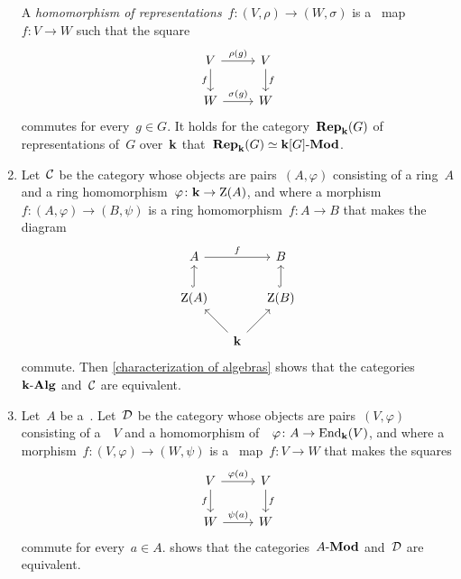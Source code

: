 \begin{example}
\begin{enumerate}
      A \emph{homomorphism of representations}~$f \colon (V, \rho) \to (W,\sigma)$ is a~{\klin} map~$f \colon V \to W$ such that the square
      \[
        \begin{tikzcd}
            V
            \arrow{r}[above]{\rho(g)}
            \arrow{d}[left]{f}
          & V
            \arrow{d}[right]{f}
          \\
            W
            \arrow{r}[above]{\sigma(g)}
          & W
        \end{tikzcd}
      \]
      commutes for every~$g \in G$.
      It holds for the category~$\mathbf{Rep}_{\mathbf{k}}(G)$ of representations of~$G$ over~$\kf$ that~$\mathbf{Rep}_{\mathbf{k}}(G) \simeq \text{$\mathbf{k}[G]$-$\mathbf{Mod}$}$.
    \item
      Let~$\mathcal{C}$ be the category whose objects are pairs~$(A, \varphi)$ consisting of a ring~$A$ and a ring homomorphism~$\varphi \colon \mathbf{k} \to \operatorname{Z}(A)$, and where a morphism~$f \colon (A, \varphi) \to (B, \psi)$ is a ring homomorphism~$f \colon A \to B$ that makes the diagram
      \[
        \begin{tikzcd}[column sep = small]
            A
            \arrow{rr}[above]{f}
          & {}
          & B
          \\
            \ringcenter(A)
            \arrow[hook]{u}
          & {}
          & \ringcenter(B)
            \arrow[hook]{u}
          \\
            {}
          & \kf
            \arrow{ul}
            \arrow{ur}
          & {}
        \end{tikzcd}
      \]
      commute.
      Then \cref{characterization of algebras} shows that the categories~$\text{$\mathbf{k}$-$\mathbf{Alg}$}$ and~$\mathcal{C}$ are equivalent.
    \item
      Let~$A$ be a~{\kalg}.
      Let~$\mathcal{D}$ be the category whose objects are pairs~$(V, \varphi)$ consisting of a~{\module{$\kf$}}~$V$ and a homomorphism of~{\kalgs}~$\varphi \colon A \to \operatorname{End}_{\mathbf{k}}(V)$, and where a morphism~$f \colon (V,\varphi) \to (W,\psi)$ is a~{\klin} map~$f \colon V \to W$ that makes the squares
      \[
        \begin{tikzcd}
            V
            \arrow{r}[above]{\varphi(a)}
            \arrow{d}[left]{f}
          & V
            \arrow{d}[right]{f}
          \\
            W
            \arrow{r}[above]{\psi(a)}
          & W
        \end{tikzcd}
      \]
      commute for every~$a \in A$.
       shows that the categories~$\text{$A$-$\mathbf{Mod}$}$ and~$\mathcal{D}$ are equivalent.
  \end{enumerate}
\end{example}






